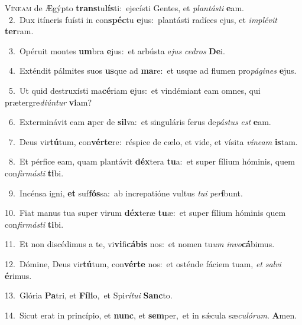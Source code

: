 \lettrine{\initial\textcolor{\initialcolor}{V}}{íneam} de Ægýpto \textbf{trans}\-tu\-\textbf{lís}\-ti:~\star ejecísti Gentes, et \textit{plan}\-\textit{tás}\textit{ti} \textbf{e}\-am.\\
{\numbfont\textcolor{\numbcolor}{~2.}}~Dux itíneris fuísti in con\-\textbf{spéc}\-tu \textbf{e}\-jus:~\star plantásti radíces ejus, et \textit{im}\-\textit{plé}\textit{vit} \textbf{ter}\-ram.\par
{\numbfont\textcolor{\numbcolor}{~3.}}~Opéruit montes \textbf{um}\-bra \textbf{e}\-jus:~\star et arbústa e\textit{jus} \textit{ce}\-\textit{dros} \textbf{De}\-i.\par
{\numbfont\textcolor{\numbcolor}{~4.}}~Exténdit pálmites suos \textbf{us}\-que ad \textbf{ma}\-re:~\star et usque ad flumen pro\-\textit{pá}\-\textit{gi}\textit{nes} \textbf{e}\-jus.\par
{\numbfont\textcolor{\numbcolor}{~5.}}~Ut quid destruxísti ma\-\textbf{cé}\-riam \textbf{e}\-jus:~\star et vindémiant eam omnes, qui prætergre\-\textit{di}\-\textit{ún}\textit{tur} \textbf{vi}\-am?\par
{\numbfont\textcolor{\numbcolor}{~6.}}~Exterminávit eam \textbf{a}\-per de \textbf{sil}\-va:~\star et singuláris ferus de\-\textit{pás}\-\textit{tus} \textit{est} \textbf{e}\-am.\par
{\numbfont\textcolor{\numbcolor}{~7.}}~Deus vir\-\textbf{tú}\-tum, con\-\textbf{vér}\-\textbf{te}re:~\star réspice de cælo, et vide, et vísita \textit{ví}\-\textit{ne}\textit{am} \textbf{is}\-tam.\par
{\numbfont\textcolor{\numbcolor}{~8.}}~Et pérfice eam, quam plantávit \textbf{déx}\-tera \textbf{tu}\-a:~\star et super fílium hóminis, quem con\-\textit{fir}\-\textit{más}\textit{ti} \textbf{ti}\-bi.\par
{\numbfont\textcolor{\numbcolor}{~9.}}~Incénsa igni, \textbf{et} suf\-\textbf{fós}\-sa:~\star ab increpatióne vultus \textit{tu}\-\textit{i} \textit{per}\-\textbf{í}bunt.\par
{\numbfont\textcolor{\numbcolor}{10.}}~Fiat manus tua super virum \textbf{déx}\-teræ \textbf{tu}\-æ:~\star et super fílium hóminis quem con\-\textit{fir}\-\textit{más}\textit{ti} \textbf{ti}\-bi.\par
{\numbfont\textcolor{\numbcolor}{11.}}~Et non discédimus a te, vi\-\textbf{vi}\-fi\-\textbf{cá}\-\textbf{bis} nos:~\star et nomen tu\textit{um} \textit{in}\-\textit{vo}\textbf{cá}bimus.\par
{\numbfont\textcolor{\numbcolor}{12.}}~Dómine, Deus vir\-\textbf{tú}\-tum, con\-\textbf{vér}\-\textbf{te} nos:~\star et osténde fáciem tuam, \textit{et} \textit{sal}\-\textit{vi} \textbf{é}\-rimus.\par
{\numbfont\textcolor{\numbcolor}{13.}}~Glória \textbf{Pa}\-tri, et \textbf{Fí}\-\textbf{li}o,~\star et Spi\-\textit{rí}\-\textit{tu}\textit{i} \textbf{Sanc}\-to.\par
{\numbfont\textcolor{\numbcolor}{14.}}~Sicut erat in princípio, et \textbf{nunc}\-, et \textbf{sem}\-per,~\star et in sǽcula sæ\-\textit{cu}\-\textit{ló}\textit{rum}. \textbf{A}\-men.\par

